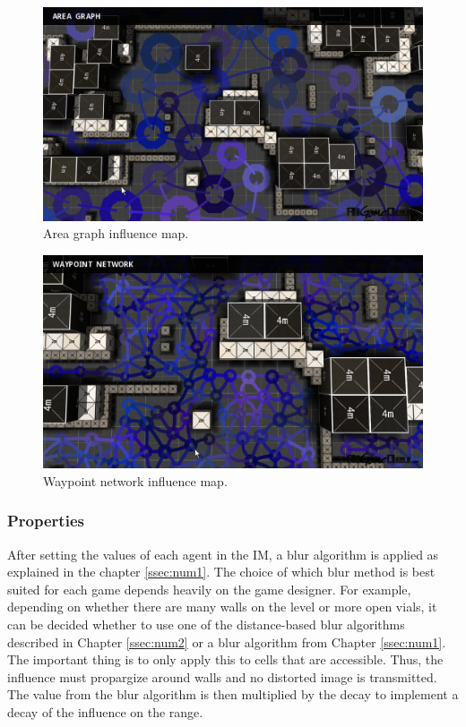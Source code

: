 \documentclass[]{report}
\begin{document}
	\begin{figure}[h!]
		\centering
		\includegraphics[width=1\linewidth]{Images/screenshot001_aregraph1}
		\caption[Area graph influence map.]{Area graph influence map. \citep{gameDevInfluenceMap} \citep{imPathfinding}}
		\label{fig:screenshot001aregraph1}
	\end{figure}
	
	\begin{figure}[h!]
		\centering
		\includegraphics[width=1\linewidth]{Images/screenshot001_aregraph2}
		\caption[Waypoint network influence map.]{Waypoint network influence map. \citep{gameDevInfluenceMap} \citep{imPathfinding}}
		\label{fig:screenshot001aregraph2}
	\end{figure}
	
	\newpage
	\subsubsection{Properties}
	After setting the values of each agent in the \ac{IM}, a blur algorithm is applied as explained in the chapter \ref{ssec:num1}. The choice of which blur method is best suited for each game depends heavily on the game designer. For example, depending on whether there are many walls on the level or more open vials, it can be decided whether to use one of the distance-based blur algorithms described in Chapter \ref{ssec:num2} or a blur algorithm from Chapter \ref{ssec:num1}. The important thing is to only apply this to cells that are accessible. Thus, the influence must propargize around walls and no distorted image is transmitted. The value from the blur algorithm is then multiplied by the decay to implement a decay of the influence on the range. 
	
\end{document}
